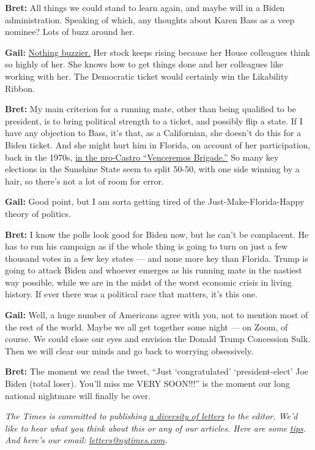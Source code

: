 \textbf{Bret:} All things we could stand to learn again, and maybe will
in a Biden administration. Speaking of which, any thoughts about Karen
Bass as a veep nominee? Lots of buzz around her.

\textbf{Gail:}
\href{https://www.nytimes.com/2020/07/31/us/politics/joseph-biden-vice-president.html}{Nothing
buzzier.} Her stock keeps rising because her House colleagues think so
highly of her. She knows how to get things done and her colleagues like
working with her. The Democratic ticket would certainly win the
Likability Ribbon.

\textbf{Bret:} My main criterion for a running mate, other than being
qualified to be president, is to bring political strength to a ticket,
and possibly flip a state. If I have any objection to Bass, it's that,
as a Californian, she doesn't do this for a Biden ticket. And she might
hurt him in Florida, on account of her participation, back in the 1970s,
\href{https://www.theatlantic.com/politics/archive/2020/07/karen-bass-cuba-venceremos-brigade/614662/}{in
the pro-Castro ``Venceremos Brigade.''} So many key elections in the
Sunshine State seem to split 50-50, with one side winning by a hair, so
there's not a lot of room for error.

\textbf{Gail:} Good point, but I am sorta getting tired of the
Just-Make-Florida-Happy theory of politics.

\textbf{Bret:} I know the polls look good for Biden now, but he can't be
complacent. He has to run his campaign as if the whole thing is going to
turn on just a few thousand votes in a few key states --- and none more
key than Florida. Trump is going to attack Biden and whoever emerges as
his running mate in the nastiest way possible, while we are in the midst
of the worst economic crisis in living history. If ever there was a
political race that matters, it's this one.

\textbf{Gail:} Well, a huge number of Americans agree with you, not to
mention most of the rest of the world. Maybe we all get together some
night --- on Zoom, of course. We could close our eyes and envision the
Donald Trump Concession Sulk. Then we will clear our minds and go back
to worrying obsessively.

\textbf{Bret:} The moment we read the tweet, ``Just `congratulated'
`president-elect' Joe Biden (total loser). You'll miss me VERY SOON!!!''
is the moment our long national nightmare will finally be over.

\emph{The Times is committed to publishing}
\href{https://www.nytimes.com/2019/01/31/opinion/letters/letters-to-editor-new-york-times-women.html}{\emph{a
diversity of letters}} \emph{to the editor. We'd like to hear what you
think about this or any of our articles. Here are some}
\href{https://help.nytimes.com/hc/en-us/articles/115014925288-How-to-submit-a-letter-to-the-editor}{\emph{tips}}\emph{.
And here's our email:}
\href{mailto:letters@nytimes.com}{\emph{letters@nytimes.com}}\emph{.}

